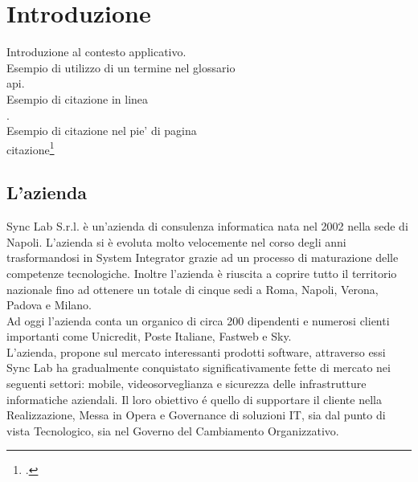 
\chapter{Introduzione}
\label{cap:introduzione}

Introduzione al contesto applicativo.\\

\noindent Esempio di utilizzo di un termine nel glossario \\
\gls{api}. \\

\noindent Esempio di citazione in linea \\
\cite{site:agile-manifesto}. \\

\noindent Esempio di citazione nel pie' di pagina \\
citazione\footcite{womak:lean-thinking} \\

\section{L'azienda}

Sync Lab S.r.l. è un'azienda di consulenza informatica nata nel 2002 nella sede di Napoli. L'azienda si è evoluta molto velocemente nel corso degli anni trasformandosi in System Integrator grazie ad un processo di maturazione delle competenze tecnologiche. Inoltre l'azienda è riuscita a coprire tutto il territorio nazionale fino ad ottenere un totale di cinque sedi a Roma, Napoli, Verona, Padova e Milano.\\
Ad oggi l'azienda conta un organico di circa 200 dipendenti e numerosi clienti importanti come Unicredit, Poste Italiane, Fastweb e Sky. \\
L'azienda, propone sul mercato interessanti prodotti software, attraverso essi Sync Lab ha gradualmente conquistato significativamente fette di mercato nei seguenti settori: mobile, videosorveglianza e sicurezza delle infrastrutture informatiche aziendali.
Il loro obiettivo é quello di supportare il cliente nella Realizzazione, Messa in Opera e Governance di soluzioni IT, sia dal punto di vista Tecnologico, sia nel Governo del Cambiamento Organizzativo.

